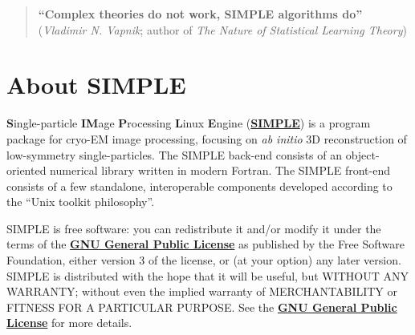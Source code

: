 \documentclass[a4paper,11pt]{article}
\begin{document}
\begin{quote}
\textbf{``Complex theories do not work, SIMPLE algorithms do''}\\(\textit{Vladimir N. Vapnik}; author of \textit{The Nature of Statistical Learning Theory})
\end{quote}
\clearpage

\tableofcontents{}
\clearpage

\section{About SIMPLE}

\textbf{S}ingle-particle \textbf{IM}age \textbf{P}rocessing \textbf{L}inux \textbf{E}ngine (\href{www.simplecryoem.com}{\textbf{\textcolor{BurntOrange}{SIMPLE}}}) is a program package for cryo-EM image processing, focusing on \textit{ab initio} 3D reconstruction of low-symmetry single-particles. The SIMPLE back-end consists of an object-oriented numerical library written in modern Fortran. The SIMPLE front-end consists of a few standalone, interoperable components developed according to the ``Unix toolkit philosophy''.

SIMPLE is free software: you can redistribute it and/or modify it under the terms of the \href{http://www.gnu.org/copyleft/gpl.html}{\textbf{\textcolor{BurntOrange}{GNU General Public License}}} as published by the Free Software Foundation, either version 3 of the license, or (at your option) any later version. SIMPLE is distributed with the hope that it will be useful, but WITHOUT ANY WARRANTY; without even the implied warranty of MERCHANTABILITY or FITNESS FOR A PARTICULAR PURPOSE. See the \href{http://www.gnu.org/copyleft/gpl.html}{\textbf{\textcolor{BurntOrange}{GNU General Public License}}} for more details.
\end{document}

